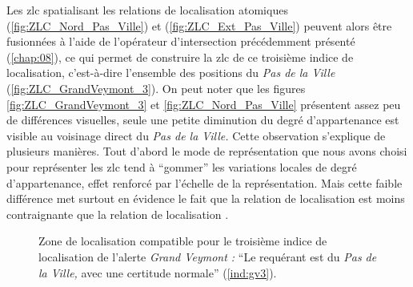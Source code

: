 Les \ac{zlc} spatialisant les relations de localisation atomiques
 (\autoref{fig:ZLC_Nord_Pas_Ville}) et
(\autoref{fig:ZLC_Ext_Pas_Ville}) peuvent alors être fusionnées à
l'aide de l'opérateur d'intersection précédemment présenté
(\autoref{chap:08}), ce qui permet de construire la \ac{zlc} de ce
troisième indice de localisation, c'est-à-dire l'ensemble des
positions  du \emph{Pas de la Ville}
(\autoref{fig:ZLC_GrandVeymont_3}). On peut noter que les figures
\autoref{fig:ZLC_GrandVeymont_3} et \autoref{fig:ZLC_Nord_Pas_Ville}
présentent assez peu de différences visuelles, seule une petite
diminution du degré d'appartenance est visible au voisinage direct du
\emph{Pas de la Ville.} Cette observation s'explique de plusieurs
manières. Tout d'abord le mode de représentation que nous avons choisi
pour représenter les \ac{zlc} tend à \enquote{gommer} les variations
locales de degré d'appartenance, effet renforcé par l'échelle de la
représentation. Mais cette faible différence met surtout en évidence
le fait que la relation de localisation
 est moins contraignante que
la relation de localisation .

\begin{figure}
  \centering
  
  \caption{Zone de localisation compatible pour le troisième indice de
    localisation de l'alerte \emph{Grand Veymont :} \enquote{Le
      requérant est \protect{} du
      \emph{Pas de la Ville,} avec une certitude normale}
    (\ref{ind:gv3}).}
  \label{fig:ZLC_GrandVeymont_3}
\end{figure}









